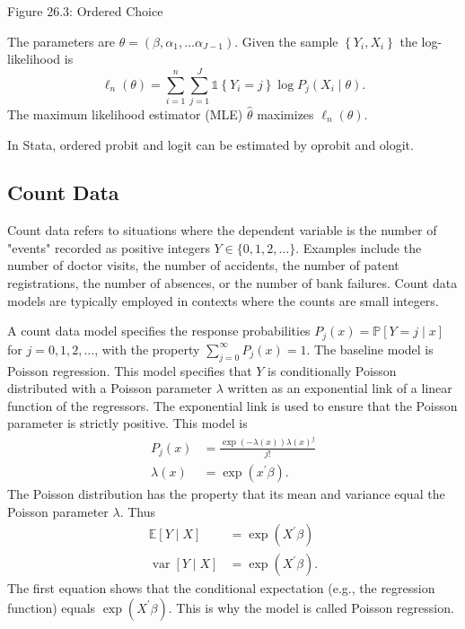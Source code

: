 \documentclass[10pt]{article}
\begin{document}
Figure 26.3: Ordered Choice

The parameters are $\theta=\left(\beta, \alpha_{1}, \ldots \alpha_{J-1}\right)$. Given the sample $\left\{Y_{i}, X_{i}\right\}$ the log-likelihood is
$$
\ell_{n}(\theta)=\sum_{i=1}^{n} \sum_{j=1}^{J} \mathbb{1}\left\{Y_{i}=j\right\} \log P_{j}\left(X_{i} \mid \theta\right) .
$$
The maximum likelihood estimator (MLE) $\widehat{\theta}$ maximizes $\ell_{n}(\theta)$.

In Stata, ordered probit and logit can be estimated by oprobit and ologit.

\subsection{Count Data}
Count data refers to situations where the dependent variable is the number of "events" recorded as positive integers $Y \in\{0,1,2, \ldots\}$. Examples include the number of doctor visits, the number of accidents, the number of patent registrations, the number of absences, or the number of bank failures. Count data models are typically employed in contexts where the counts are small integers.

A count data model specifies the response probabilities $P_{j}(x)=\mathbb{P}[Y=j \mid x]$ for $j=0,1,2, \ldots$, with the property $\sum_{j=0}^{\infty} P_{j}(x)=1$. The baseline model is Poisson regression. This model specifies that $Y$ is conditionally Poisson distributed with a Poisson parameter $\lambda$ written as an exponential link of a linear function of the regressors. The exponential link is used to ensure that the Poisson parameter is strictly positive. This model is
$$
\begin{aligned}
P_{j}(x) &=\frac{\exp (-\lambda(x)) \lambda(x)^{j}}{j !} \\
\lambda(x) &=\exp \left(x^{\prime} \beta\right) .
\end{aligned}
$$
The Poisson distribution has the property that its mean and variance equal the Poisson parameter $\lambda$. Thus
$$
\begin{aligned}
\mathbb{E}[Y \mid X] &=\exp \left(X^{\prime} \beta\right) \\
\operatorname{var}[Y \mid X] &=\exp \left(X^{\prime} \beta\right) .
\end{aligned}
$$
The first equation shows that the conditional expectation (e.g., the regression function) equals $\exp \left(X^{\prime} \beta\right)$. This is why the model is called Poisson regression.
\end{document}
